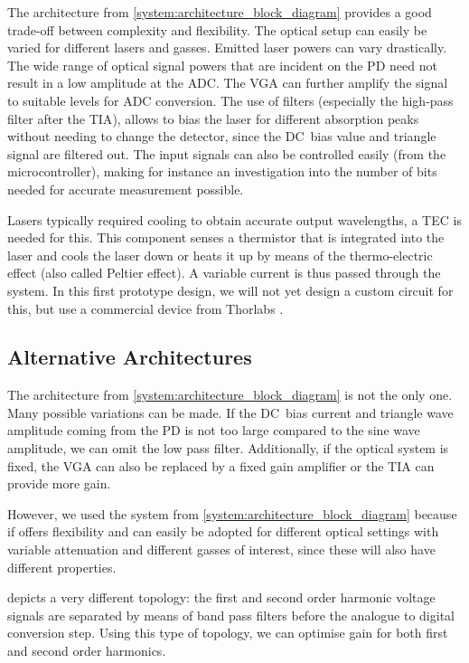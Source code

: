 \documentclass[\home/main.tex]{subfiles}
\begin{document}
  The architecture from \cref{system:architecture_block_diagram} provides a good trade-off between complexity and flexibility. The optical setup can easily be varied for different lasers and gasses. Emitted laser powers can vary drastically. The wide range of optical signal powers that are incident on the \acrshort{PD} need not result in a low amplitude at the \acrshort{ADC}. The \acrshort{VGA} can further amplify the signal to suitable levels for \acrshort{ADC} conversion. The use of filters (especially the high-pass filter after the \acrshort{TIA}), allows to bias the laser for different absorption peaks without needing to change the detector, since the \acrshort{DC}~bias value and triangle signal are filtered out. The input signals can also be controlled easily (from the microcontroller), making for instance an investigation into the number of bits needed for accurate measurement possible. 
  
  Lasers typically required cooling to obtain accurate output wavelengths, a \acrfull{TEC} is needed for this. This component senses a thermistor that is integrated into the laser and cools the laser down or heats it up by means of the thermo-electric effect (also called Peltier effect). A variable current is thus passed through the system. In this first prototype design, we will not yet design a custom circuit for this, but use a commercial device from Thorlabs \cite{TEC}. 
  
  \subsection{Alternative Architectures}
  
    The architecture from \cref{system:architecture_block_diagram} is not the only one. Many possible variations can be made. If the \acrshort{DC}~bias current and triangle wave amplitude coming from the \acrshort{PD} is not too large compared to the sine wave amplitude, we can omit the low pass filter. Additionally, if the optical system is fixed, the \acrshort{VGA} can also be replaced by a fixed gain amplifier or the \acrshort{TIA} can provide more gain. 
    
    However, we used the system from \cref{system:architecture_block_diagram} because if offers flexibility and can easily be adopted for different optical settings with variable attenuation and different gasses of interest, since these will also have different properties.
    
     depicts a very different topology: the first and second order harmonic voltage signals are separated by means of band pass filters before the analogue to digital conversion step. Using this type of topology, we can optimise gain for both first and second order harmonics. 
    
\end{document}
